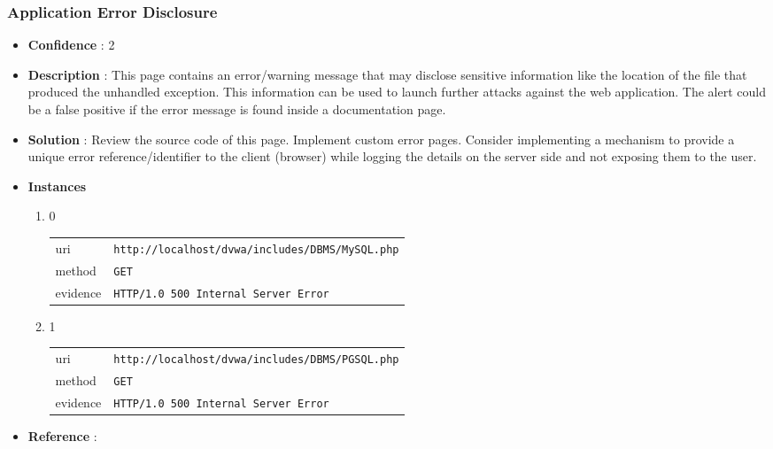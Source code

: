 \documentclass[10pt]{article}
\begin{document}
\subsubsection{Application Error Disclosure}
\begin{itemize}
\item[] \textbf{Confidence} : 2
\item[] \textbf{Description} : This page contains an error/warning message that may disclose sensitive information like the location of the file that produced the unhandled exception. This information can be used to launch further attacks against the web application. The alert could be a false positive if the error message is found inside a documentation page.
\item[] \textbf{Solution} :  Review the source code of this page. Implement custom error pages. Consider implementing a mechanism to provide a unique error reference/identifier to the client (browser) while logging the details on the server side and not exposing them to the user.
\item[] \textbf{Instances}
\begin{enumerate}
\item[] 0
\begin{tabular}{| l | p{12cm}}
uri & \texttt{http://localhost/dvwa/includes/DBMS/MySQL.php} \\
method & \texttt{GET} \\
evidence & \texttt{HTTP/1.0 500 Internal Server Error} \\
\end{tabular}
\item[] 1
\begin{tabular}{| l | p{12cm}}
uri & \texttt{http://localhost/dvwa/includes/DBMS/PGSQL.php} \\
method & \texttt{GET} \\
evidence & \texttt{HTTP/1.0 500 Internal Server Error} \\
\end{tabular}
\end{enumerate}
\item[] \textbf{Reference} : 
\end{itemize}
\end{document}
